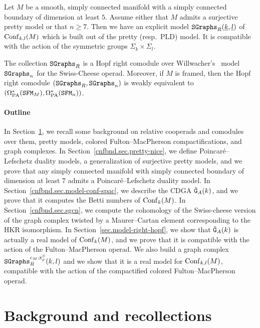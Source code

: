 \begin{theoremintro}
  \label{cnfbnd.thm.B}
  Let $M$ be a smooth, simply connected manifold with a simply connected boundary of dimension at least $5$.
  Assume either that $M$ admits a surjective pretty model or that $n \geq 7$.
  Then we have an explicit model $\mathtt{SGraphs}_{R}(\underline{k}, \underline{l})$ of $\operatorname{Conf}_{k,l}(M)$ which is built out of the pretty (resp.\ PLD) model.
  It is compatible with the action of the symmetric groups $\Sigma_{k} \times \Sigma_{l}$.

  The collection $\mathtt{SGraphs}_{R}$ is a Hopf right comodule over Willwacher's~\cite{Willwacher2015a} model $\mathtt{SGraphs}_{n}$ for the Swiss-Cheese operad.
  Moreover, if $M$ is framed, then the Hopf right comodule $(\mathtt{SGraphs}_{R}, \mathtt{SGraphs}_{n})$ is weakly equivalent to $(\Omega_{\mathrm{PA}}^{*}(\mathtt{SFM}_{M}), \Omega_{\mathrm{PA}}^{*}(\mathtt{SFM}_{n}))$.
\end{theoremintro}

\paragraph{Outline}

In Section~\ref{cnfbnd.sec.backgr-recoll}, we recall some background on relative cooperads and comodules over them, pretty models, colored Fulton--MacPherson compactifications, and graph complexes.
In Section~\ref{cnfbnd.sec.pretty-nice}, we define Poincaré--Lefschetz duality models, a generalization of surjective pretty models, and we prove that any simply connected manifold with simply connected boundary of dimension at least $7$ admits a Poincaré--Lefschetz duality model.
In Section~\ref{cnfbnd.sec.model-conf-spac}, we describe the CDGA $\tilde{\mathtt{G}}_{A}(k)$, and we prove that it computes the Betti numbers of $\operatorname{Conf}_{k}(M)$.
In Section~\ref{cnfbnd.sec.sgcn}, we compute the cohomology of the Swiss-cheese version of the graph complex twisted by a Maurer--Cartan element corresponding to the HKR isomorphism.
In Section~\ref{sec.model-right-hopf}, we show that $\tilde{\mathtt{G}}_{A}(k)$ is actually a real model of $\operatorname{Conf}_{k}(M)$, and we prove that it is compatible with the action of the Fulton--MacPherson operad.
We also build a graph complex $\mathtt{SGraphs}_{R}^{c_{M},\mathrm{z}^{S}_{\varphi}}(k,l)$ and we show that it is a real model for $\operatorname{Conf}_{k,l}(M)$, compatible with the action of the compactified colored Fulton--MacPherson operad.


\section{Background and recollections}
\label{cnfbnd.sec.backgr-recoll}

